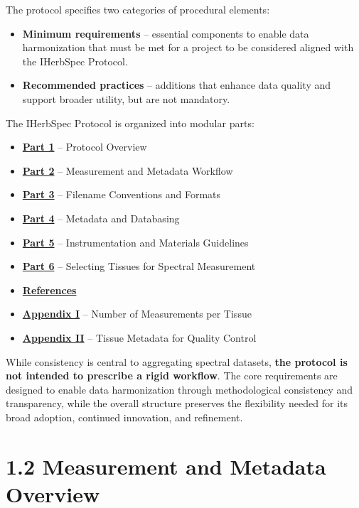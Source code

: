 \documentclass[
  letterpaper,
  DIV=11,
  numbers=noendperiod]{scrreprt}
\providecommand{\tightlist}{%
  \setlength{\itemsep}{0pt}\setlength{\parskip}{0pt}}
\begin{document}
The protocol specifies two categories of procedural elements:

\begin{itemize}
\tightlist
\item
  \textbf{Minimum requirements} -- essential components to enable data
  harmonization that must be met for a project to be considered aligned
  with the IHerbSpec Protocol.
\item
  \textbf{Recommended practices} -- additions that enhance data quality
  and support broader utility, but are not mandatory.
\end{itemize}

The IHerbSpec Protocol is organized into modular parts:

\begin{itemize}
\tightlist
\item
  \hyperref[part1]{\textbf{Part 1}} -- Protocol Overview
\item
  \hyperref[part2]{\textbf{Part 2}} -- Measurement and Metadata Workflow
\item
  \hyperref[part3]{\textbf{Part 3}} -- Filename Conventions and Formats
\item
  \hyperref[part4]{\textbf{Part 4}} -- Metadata and Databasing
\item
  \hyperref[part5]{\textbf{Part 5}} -- Instrumentation and Materials
  Guidelines
\item
  \hyperref[part6]{\textbf{Part 6}} -- Selecting Tissues for Spectral
  Measurement
\item
  \hyperref[references]{\textbf{References}}
\item
  \hyperref[app1]{\textbf{Appendix I}} -- Number of Measurements per
  Tissue
\item
  \hyperref[app2]{\textbf{Appendix II}} -- Tissue Metadata for Quality
  Control
\end{itemize}

While consistency is central to aggregating spectral datasets,
\textbf{the protocol is not intended to prescribe a rigid workflow}. The
core requirements are designed to enable data harmonization through
methodological consistency and transparency, while the overall structure
preserves the flexibility needed for its broad adoption, continued
innovation, and refinement.

\section{1.2 Measurement and Metadata
Overview}\label{measurement-and-metadata-overview}
\end{document}
